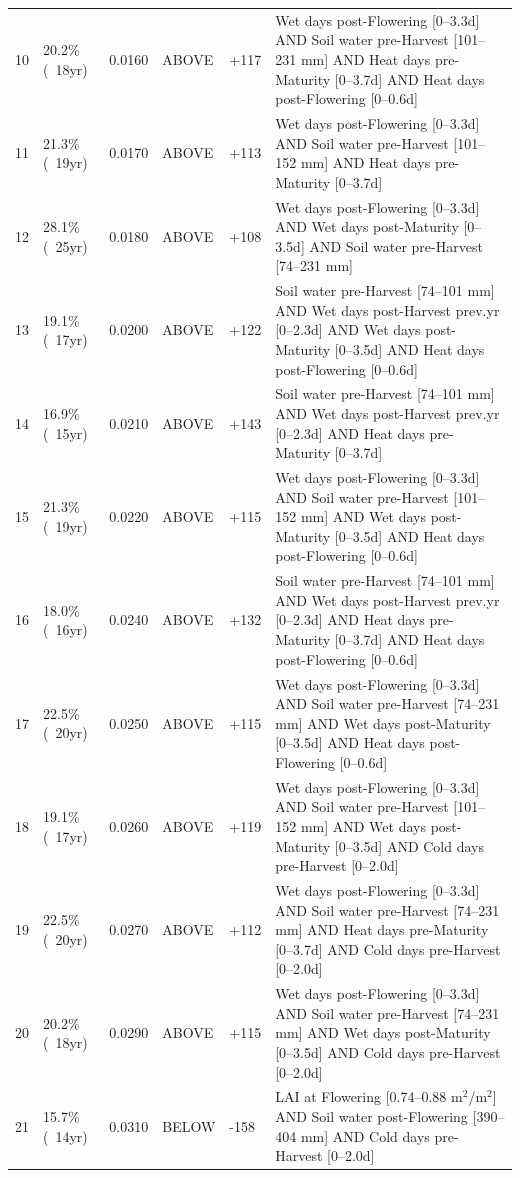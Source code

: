 {\begin{longtable}{p{0.4cm}|p{1.5cm}|p{1.2cm}|p{1.3cm}|p{1.5cm}|p{8.2cm}}
  10 & 20.2\% (~18yr) & 0.0160 & ABOVE & +117 & Wet days post-Flowering [0--3.3d] AND Soil water pre-Harvest [101--231 mm] AND Heat days pre-Maturity [0--3.7d] AND Heat days post-Flowering [0--0.6d] \\
  11 & 21.3\% (~19yr) & 0.0170 & ABOVE & +113 & Wet days post-Flowering [0--3.3d] AND Soil water pre-Harvest [101--152 mm] AND Heat days pre-Maturity [0--3.7d] \\
  12 & 28.1\% (~25yr) & 0.0180 & ABOVE & +108 & Wet days post-Flowering [0--3.3d] AND Wet days post-Maturity [0--3.5d] AND Soil water pre-Harvest [74--231 mm] \\
  13 & 19.1\% (~17yr) & 0.0200 & ABOVE & +122 & Soil water pre-Harvest [74--101 mm] AND Wet days post-Harvest prev.yr [0--2.3d] AND Wet days post-Maturity [0--3.5d] AND Heat days post-Flowering [0--0.6d] \\
  14 & 16.9\% (~15yr) & 0.0210 & ABOVE & +143 & Soil water pre-Harvest [74--101 mm] AND Wet days post-Harvest prev.yr [0--2.3d] AND Heat days pre-Maturity [0--3.7d] \\
  15 & 21.3\% (~19yr) & 0.0220 & ABOVE & +115 & Wet days post-Flowering [0--3.3d] AND Soil water pre-Harvest [101--152 mm] AND Wet days post-Maturity [0--3.5d] AND Heat days post-Flowering [0--0.6d] \\
  16 & 18.0\% (~16yr) & 0.0240 & ABOVE & +132 & Soil water pre-Harvest [74--101 mm] AND Wet days post-Harvest prev.yr [0--2.3d] AND Heat days pre-Maturity [0--3.7d] AND Heat days post-Flowering [0--0.6d] \\
  17 & 22.5\% (~20yr) & 0.0250 & ABOVE & +115 & Wet days post-Flowering [0--3.3d] AND Soil water pre-Harvest [74--231 mm] AND Wet days post-Maturity [0--3.5d] AND Heat days post-Flowering [0--0.6d] \\
  18 & 19.1\% (~17yr) & 0.0260 & ABOVE & +119 & Wet days post-Flowering [0--3.3d] AND Soil water pre-Harvest [101--152 mm] AND Wet days post-Maturity [0--3.5d] AND Cold days pre-Harvest [0--2.0d] \\
  19 & 22.5\% (~20yr) & 0.0270 & ABOVE & +112 & Wet days post-Flowering [0--3.3d] AND Soil water pre-Harvest [74--231 mm] AND Heat days pre-Maturity [0--3.7d] AND Cold days pre-Harvest [0--2.0d] \\
  20 & 20.2\% (~18yr) & 0.0290 & ABOVE & +115 & Wet days post-Flowering [0--3.3d] AND Soil water pre-Harvest [74--231 mm] AND Wet days post-Maturity [0--3.5d] AND Cold days pre-Harvest [0--2.0d] \\
  21 & 15.7\% (~14yr) & 0.0310 & BELOW & -158 & LAI at Flowering [0.74--0.88 m$^2$/m$^2$] AND Soil water post-Flowering [390--404 mm] AND Cold days pre-Harvest [0--2.0d] \\

\end{longtable}}
